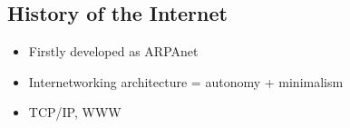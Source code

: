 \subsection{History of the Internet}
\begin{itemize}
	\item Firstly developed as ARPAnet
	\item Internetworking architecture = autonomy + minimalism
	\item TCP/IP, WWW
\end{itemize}
